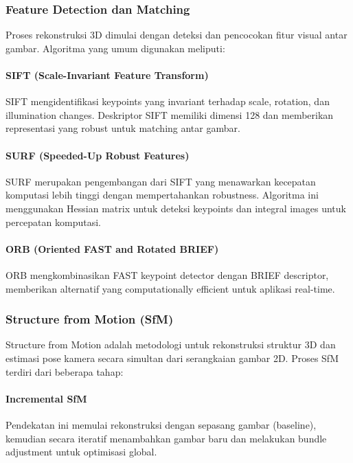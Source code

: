 \documentclass[12pt,a4paper]{article}
\begin{document}
\subsubsection{Feature Detection dan Matching}

Proses rekonstruksi 3D dimulai dengan deteksi dan pencocokan fitur visual antar gambar. Algoritma yang umum digunakan meliputi:

\paragraph{SIFT (Scale-Invariant Feature Transform)}
SIFT mengidentifikasi keypoints yang invariant terhadap scale, rotation, dan illumination changes. Deskriptor SIFT memiliki dimensi 128 dan memberikan representasi yang robust untuk matching antar gambar.

\paragraph{SURF (Speeded-Up Robust Features)}
SURF merupakan pengembangan dari SIFT yang menawarkan kecepatan komputasi lebih tinggi dengan mempertahankan robustness. Algoritma ini menggunakan Hessian matrix untuk deteksi keypoints dan integral images untuk percepatan komputasi.

\paragraph{ORB (Oriented FAST and Rotated BRIEF)}
ORB mengkombinasikan FAST keypoint detector dengan BRIEF descriptor, memberikan alternatif yang computationally efficient untuk aplikasi real-time.

\subsubsection{Structure from Motion (SfM)}

Structure from Motion adalah metodologi untuk rekonstruksi struktur 3D dan estimasi pose kamera secara simultan dari serangkaian gambar 2D. Proses SfM terdiri dari beberapa tahap:

\paragraph{Incremental SfM}
Pendekatan ini memulai rekonstruksi dengan sepasang gambar (baseline), kemudian secara iteratif menambahkan gambar baru dan melakukan bundle adjustment untuk optimisasi global.
\end{document}
